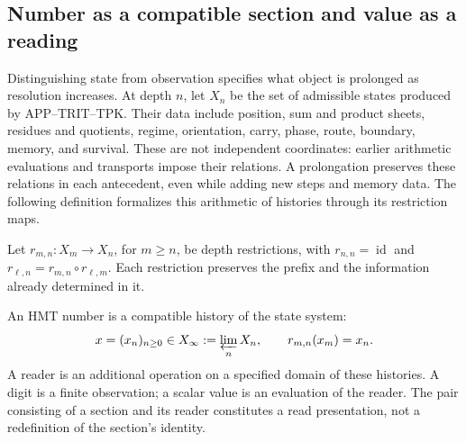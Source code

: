 
\subsection{Number as a compatible section and value as a reading}
\label{hist:seccion}

Distinguishing state from observation specifies what object is prolonged
as resolution increases. At depth \(n\), let \(X_n\) be the set of
admissible states produced by APP--TRIT--TPK. Their data include position,
sum and product sheets, residues and quotients, regime, orientation,
carry, phase, route, boundary, memory, and survival. These are not
independent coordinates: earlier arithmetic evaluations and transports
impose their relations. A prolongation preserves these relations in
each antecedent, even while adding new steps and memory data.
The following definition formalizes this arithmetic of histories
through its restriction maps.

Let \(r_{m,n}:X_m\to X_n\), for \(m\geq n\), be depth
restrictions, with \(r_{n,n}=\operatorname{id}\) and
\(r_{\ell,n}=r_{m,n}\circ r_{\ell,m}\). Each restriction preserves
the prefix and the information already determined in it.

\begin{definition}
An HMT number is a compatible history of the state system:
\begin{equation}
 x=(x_n)_{n\geq0}\in X_\infty:=\varprojlim_n X_n,
 \qquad r_{m,n}(x_m)=x_n.
 \label{hist:limite-inverso}
\end{equation}
A reader is an additional operation on a specified domain of these
histories. A digit is a finite observation; a scalar value is an evaluation
of the reader. The pair consisting of a section and its reader constitutes
a read presentation, not a redefinition of the section's identity.
\end{definition}

